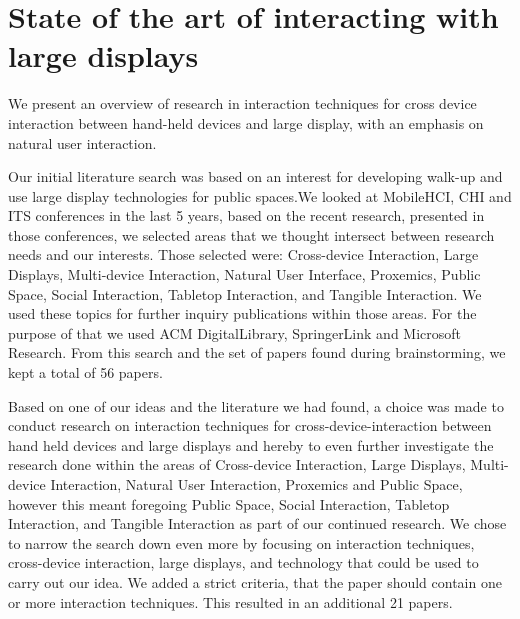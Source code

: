 \section{State of the art of interacting with large displays}
We present an overview of research in interaction techniques for cross device interaction between hand-held devices and large display, with an emphasis on natural user interaction.

Our initial literature search was based on an interest for developing walk-up and use large display technologies for public spaces.We looked at MobileHCI, CHI and ITS conferences in the last 5 years, based on the recent research, presented in those conferences, we selected areas that we thought intersect between research needs and our interests. Those selected were: Cross-device Interaction, Large Displays, Multi-device Interaction, Natural User Interface, Proxemics, Public Space, Social Interaction, Tabletop Interaction, and Tangible Interaction. We used these topics for further inquiry publications within those areas. For the purpose of that we used ACM DigitalLibrary, SpringerLink and Microsoft Research. From this search and the set of papers found during brainstorming, we kept a total of 56 papers.

Based on one of our ideas and the literature we had found, a choice was made to conduct research on interaction techniques for cross-device-interaction between hand held devices and large displays and hereby to even further investigate the research done within the areas of Cross-device Interaction, Large Displays, Multi-device Interaction, Natural User Interaction, Proxemics and Public Space, however this meant foregoing Public Space, Social Interaction, Tabletop Interaction, and Tangible Interaction as part of our continued research. We chose to narrow the search down even more by focusing on interaction techniques, cross-device interaction, large displays, and technology that could be used to carry out our idea. We added a strict criteria, that the paper should contain one or more interaction techniques. This resulted in an additional 21 papers.


